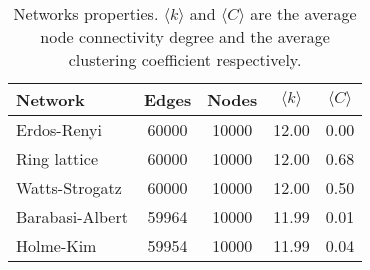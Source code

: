\begin{table}[h!]
\centering
\caption{Networks properties. $\langle k \rangle$ and $\langle C \rangle$ are the average node connectivity degree and the average clustering coefficient respectively. }
\label{tab:networks}
\begin{tabular}{lcccc}
\toprule
         Network &  Edges &  Nodes & $\langle k \rangle$ & $\langle C \rangle$ \\  %
\midrule
     Erdos-Renyi &  60000 &  10000 & 12.00 &  0.00 \\
    Ring lattice &  60000 &  10000 & 12.00 &  0.68 \\
  Watts-Strogatz &  60000 &  10000 & 12.00 &  0.50 \\
 Barabasi-Albert &  59964 &  10000 & 11.99 &  0.01 \\
       Holme-Kim &  59954 &  10000 & 11.99 &  0.04 \\
\bottomrule
\end{tabular}
\end{table}
